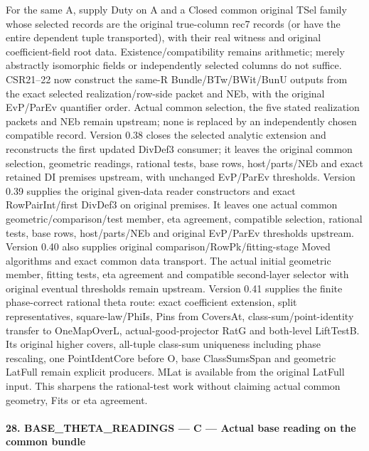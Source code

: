 For the same A, supply Duty on A and a Closed common original TSel family whose selected records are the original true-column rec7 records (or have the entire dependent tuple transported), with their real witness and original coefficient-field root data. Existence/compatibility remains arithmetic; merely abstractly isomorphic fields or independently selected columns do not suffice. CSR21–22 now construct the same-R Bundle/BTw/BWit/BunU outputs from the exact selected realization/row-side packet and NEb, with the original EvP/ParEv quantifier order. Actual common selection, the five stated realization packets and NEb remain upstream; none is replaced by an independently chosen compatible record. Version 0.38 closes the selected analytic extension and reconstructs the first updated DivDef3 consumer; it leaves the original common selection, geometric readings, rational tests, base rows, host/parts/NEb and exact retained DI premises upstream, with unchanged EvP/ParEv thresholds. Version 0.39 supplies the original given-data reader constructors and exact RowPairInt/first DivDef3 on original premises. It leaves one actual common geometric/comparison/test member, eta agreement, compatible selection, rational tests, base rows, host/parts/NEb and original EvP/ParEv thresholds upstream. Version 0.40 also supplies original comparison/RowPk/fitting-stage Moved algorithms and exact common data transport. The actual initial geometric member, fitting tests, eta agreement and compatible second-layer selector with original eventual thresholds remain upstream. Version 0.41 supplies the finite phase-correct rational theta route: exact coefficient extension, split representatives, square-law/PhiIs, Pins from CoversAt, class-sum/point-identity transfer to OneMapOverL, actual-good-projector RatG and both-level LiftTestB. Its original higher covers, all-tuple class-sum uniqueness including phase rescaling, one PointIdentCore before O, base ClassSumsSpan and geometric LatFull remain explicit producers. MLat is available from the original LatFull input. This sharpens the rational-test work without claiming actual common geometry, Fits or eta agreement.



\paragraph{28. BASE\_\allowbreak THETA\_\allowbreak READINGS — C — Actual base reading on the common bundle}


